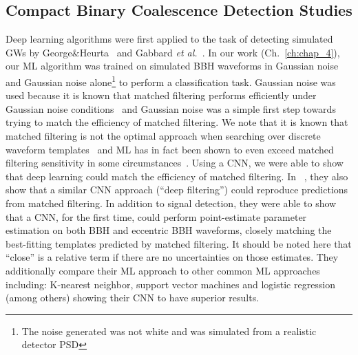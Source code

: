 %
%
\subsection{Compact Binary Coalescence Detection Studies}
Deep learning algorithms were first applied to the task of 
detecting simulated \ac{GW}s by 
George$\&$Heurta~\cite{PhysRevD.97.044039} and 
Gabbard \textit{et al.}~\cite{PhysRevLett.120.141103}. In our 
work (Ch.~\ref{ch:chap_4}), our \ac{ML} algorithm was trained 
on simulated \ac{BBH} waveforms in Gaussian noise and Gaussian 
noise alone\footnote{The noise generated was not white and was 
simulated from a realistic detector \ac{PSD}} to perform a 
classification task. Gaussian noise was used because it is 
known that matched filtering performs efficiently under 
Gaussian noise conditions~\cite{PhysRevD.49.2658} and 
Gaussian noise was a simple 
first step towards trying to match the efficiency of matched filtering. 
We note that it is known that matched filtering is not the 
optimal approach when searching over discrete 
waveform templates~\cite{2008arXiv0804.1161S,2021arXiv210403961Y} and 
\ac{ML} has in fact been 
shown to even exceed matched filtering sensitivity 
in some circumstances~\cite{2021arXiv210403961Y}. Using a \ac{CNN}, 
we were able to show that deep learning could match 
the efficiency of matched filtering. In ~\cite{PhysRevD.97.044039}, 
they also show that a similar \ac{CNN} approach 
(``deep filtering'') could reproduce predictions 
from matched filtering. In addition to signal detection, 
they were able to show that a \ac{CNN}, for the first time, could 
perform point-estimate parameter estimation on both 
\ac{BBH} and eccentric \ac{BBH} waveforms, 
closely matching the best-fitting templates predicted by 
matched filtering. It should be noted here that 
``close'' is a relative term if there are no uncertainties on those 
estimates. They 
additionally compare their \ac{ML} approach to other 
common \ac{ML} approaches including: K-nearest neighbor, 
support vector machines and logistic regression (among others) 
showing their \ac{CNN} to have superior results. 

